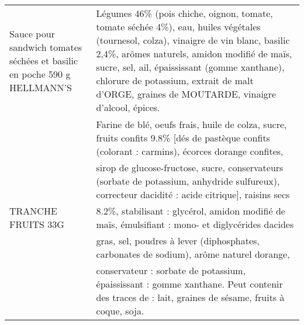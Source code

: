 \begin{longtable}{p{5cm}p{10cm}}
                                 Sauce pour sandwich tomates séchées et basilic en poche 590 g HELLMANN'S &                                                                                                                                                                                                                                                                                                                                                                                                                                                                                                                                                                                                                                                                                                      Légumes 46\% (pois chiche, oignon, tomate, tomate séchée 4\%), eau, huiles végétales (tournesol, colza), vinaigre de vin blanc, basilic 2,4\%, arômes naturels, amidon modifié de maïs, sucre, sel, ail, épaississant (gomme xanthane), chlorure de potassium, extrait de malt d'ORGE, graines de MOUTARDE, vinaigre d'alcool, épices. \\
                                                                                       TRANCHE FRUITS 33G &                                                                                                                                                                                                                                                                                                                                                                                          Farine de blé, oeufs frais, huile de colza, sucre, fruits confits 9.8\% [dés de pastèque confits (colorant : carmins), écorces dorange confites, sirop de glucose-fructose, sucre, conservateurs (sorbate de potassium, anhydride sulfureux), correcteur dacidité : acide citrique], raisins secs 8.2\%, stabilisant : glycérol, amidon modifié de maïs, émulsifiant : mono- et diglycérides dacides gras, sel, poudres à lever (diphosphates, carbonates de sodium), arôme naturel dorange, conservateur : sorbate de potassium, épaississant : gomme xanthane. Peut contenir des traces de : lait, graines de sésame, fruits à coque, soja. \\

\end{longtable}
